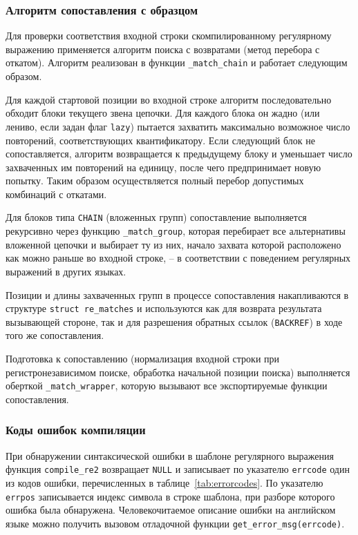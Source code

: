 \subsubsection{Алгоритм сопоставления с образцом}

Для проверки соответствия входной строки скомпилированному регулярному выражению применяется алгоритм поиска с возвратами (метод перебора с откатом). Алгоритм реализован в функции \verb`_match_chain` и работает следующим образом.

Для каждой стартовой позиции во входной строке алгоритм последовательно обходит блоки текущего звена цепочки. Для каждого блока он жадно (или лениво, если задан флаг \verb`lazy`) пытается захватить максимально возможное число повторений, соответствующих квантификатору. Если следующий блок не сопоставляется, алгоритм возвращается к предыдущему блоку и уменьшает число захваченных им повторений на единицу, после чего предпринимает новую попытку. Таким образом осуществляется полный перебор допустимых комбинаций с откатами.

Для блоков типа \verb`CHAIN` (вложенных групп) сопоставление выполняется рекурсивно через функцию \verb`_match_group`, которая перебирает все альтернативы вложенной цепочки и выбирает ту из них, начало захвата которой расположено как можно раньше во входной строке, -- в соответствии с поведением регулярных выражений в других языках.

Позиции и длины захваченных групп в процессе сопоставления накапливаются в структуре \verb`struct re_matches` и используются как для возврата результата вызывающей стороне, так и для разрешения обратных ссылок (\verb`BACKREF`) в ходе того же сопоставления.

Подготовка к сопоставлению (нормализация входной строки при регистронезависимом поиске, обработка начальной позиции поиска) выполняется оберткой \verb`_match_wrapper`, которую вызывают все экспортируемые функции сопоставления.

\subsubsection{Коды ошибок компиляции}

При обнаружении синтаксической ошибки в шаблоне регулярного выражения функция \verb`compile_re2` возвращает \verb`NULL` и записывает по указателю \verb`errcode` один из кодов ошибки, перечисленных в таблице~\ref{tab:errorcodes}. По указателю \verb`errpos` записывается индекс символа в строке шаблона, при разборе которого ошибка была обнаружена. Человекочитаемое описание ошибки на английском языке можно получить вызовом отладочной функции \verb`get_error_msg(errcode)`.

